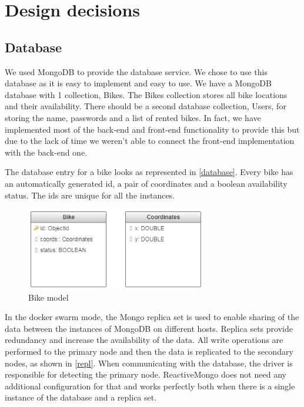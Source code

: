 \section{Design decisions}

\subsection{Database} \label{db_disc}
We used MongoDB to provide the database service. We chose to use this database as it is easy to implement and easy to use. We have a MongoDB database with 1 collection, Bikes. The Bikes collection stores all bike locations and their availability. There should be a second database collection, Users, for storing the name, passwords and a list of rented bikes. In fact, we have implemented most of the back-end and front-end functionality to provide this but due to the lack of time we weren't able to connect the front-end implementation with the back-end one.

The database entry for a bike looks as represented in \autoref{database}. Every bike has an automatically generated id, a pair of coordinates and a boolean availability status. The ids are unique for all the instances.

    \begin{figure}[H]
		\centering
		\includegraphics[width=0.7\textwidth]{images/db-structure.png}
		\caption{Bike model}
		\label{database}
	\end{figure}


In the docker swarm mode, the Mongo replica set is used to enable sharing of the data between the instances of MongoDB on different hosts. Replica sets provide redundancy and increase the availability of the data. All write operations are performed to the primary node and then the data is replicated to the secondary nodes, as shown in \autoref{repl}. When communicating with the database, the driver is responsible for detecting the primary node. ReactiveMongo does not need any additional configuration for that and works perfectly both when there is a single instance of the database and a replica set.

